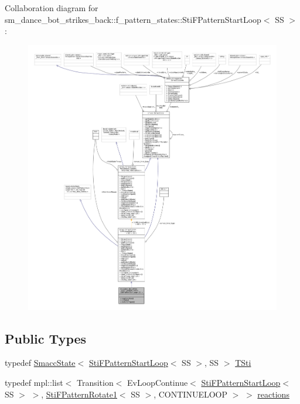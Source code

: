 Collaboration diagram for sm\+\_\+dance\+\_\+bot\+\_\+strikes\+\_\+back\+:\+:f\+\_\+pattern\+\_\+states\+:\+:Sti\+F\+Pattern\+Start\+Loop$<$ SS $>$\+:
\nopagebreak
\begin{figure}[H]
\begin{center}
\leavevmode
\includegraphics[width=350pt]{structsm__dance__bot__strikes__back_1_1f__pattern__states_1_1StiFPatternStartLoop__coll__graph}
\end{center}
\end{figure}
\subsection*{Public Types}
\begin{DoxyCompactItemize}
\item 
typedef \hyperlink{classSmaccState}{Smacc\+State}$<$ \hyperlink{structsm__dance__bot__strikes__back_1_1f__pattern__states_1_1StiFPatternStartLoop}{Sti\+F\+Pattern\+Start\+Loop}$<$ SS $>$, SS $>$ \hyperlink{structsm__dance__bot__strikes__back_1_1f__pattern__states_1_1StiFPatternStartLoop_a3c1089e9485fca72295426898cb9e3d8}{T\+Sti}
\item 
typedef mpl\+::list$<$ Transition$<$ Ev\+Loop\+Continue$<$ \hyperlink{structsm__dance__bot__strikes__back_1_1f__pattern__states_1_1StiFPatternStartLoop}{Sti\+F\+Pattern\+Start\+Loop}$<$ SS $>$ $>$, \hyperlink{structsm__dance__bot__strikes__back_1_1f__pattern__states_1_1StiFPatternRotate1}{Sti\+F\+Pattern\+Rotate1}$<$ SS $>$, C\+O\+N\+T\+I\+N\+U\+E\+L\+O\+OP $>$ $>$ \hyperlink{structsm__dance__bot__strikes__back_1_1f__pattern__states_1_1StiFPatternStartLoop_af8a53959f08045ab01af476040e5f76b}{reactions}
\end{DoxyCompactItemize}
